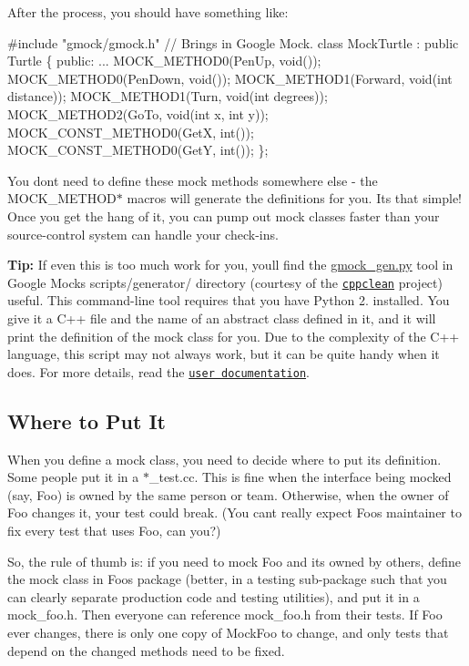 After the process, you should have something like\+:


\begin{DoxyCode}
#include "gmock/gmock.h"  // Brings in Google Mock.
class MockTurtle : public Turtle \{
 public:
  ...
  MOCK\_METHOD0(PenUp, void());
  MOCK\_METHOD0(PenDown, void());
  MOCK\_METHOD1(Forward, void(int distance));
  MOCK\_METHOD1(Turn, void(int degrees));
  MOCK\_METHOD2(GoTo, void(int x, int y));
  MOCK\_CONST\_METHOD0(GetX, int());
  MOCK\_CONST\_METHOD0(GetY, int());
\};
\end{DoxyCode}


You don\textquotesingle{}t need to define these mock methods somewhere else -\/ the {\ttfamily M\+O\+C\+K\+\_\+\+M\+E\+T\+H\+O\+D$\ast$} macros will generate the definitions for you. It\textquotesingle{}s that simple! Once you get the hang of it, you can pump out mock classes faster than your source-\/control system can handle your check-\/ins.

{\bfseries Tip\+:} If even this is too much work for you, you\textquotesingle{}ll find the {\ttfamily \hyperlink{gmock__gen_8py}{gmock\+\_\+gen.\+py}} tool in Google Mock\textquotesingle{}s {\ttfamily scripts/generator/} directory (courtesy of the \href{http://code.google.com/p/cppclean/}{\tt cppclean} project) useful. This command-\/line tool requires that you have Python 2. installed. You give it a C++ file and the name of an abstract class defined in it, and it will print the definition of the mock class for you. Due to the complexity of the C++ language, this script may not always work, but it can be quite handy when it does. For more details, read the \href{../scripts/generator/README}{\tt user documentation}.

\subsection*{Where to Put It}

When you define a mock class, you need to decide where to put its definition. Some people put it in a {\ttfamily $\ast$\+\_\+test.cc}. This is fine when the interface being mocked (say, {\ttfamily Foo}) is owned by the same person or team. Otherwise, when the owner of {\ttfamily Foo} changes it, your test could break. (You can\textquotesingle{}t really expect {\ttfamily Foo}\textquotesingle{}s maintainer to fix every test that uses {\ttfamily Foo}, can you?)

So, the rule of thumb is\+: if you need to mock {\ttfamily Foo} and it\textquotesingle{}s owned by others, define the mock class in {\ttfamily Foo}\textquotesingle{}s package (better, in a {\ttfamily testing} sub-\/package such that you can clearly separate production code and testing utilities), and put it in a {\ttfamily mock\+\_\+foo.\+h}. Then everyone can reference {\ttfamily mock\+\_\+foo.\+h} from their tests. If {\ttfamily Foo} ever changes, there is only one copy of {\ttfamily Mock\+Foo} to change, and only tests that depend on the changed methods need to be fixed.

